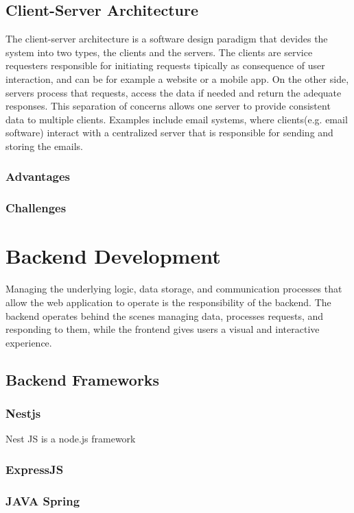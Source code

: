 \subsection{Client-Server Architecture}
The client-server architecture is a software design paradigm that devides the
system into two types, the clients and the servers. The clients are service
requesters responsible for initiating requests tipically as consequence of user
interaction, and can be for example a website or a mobile app. On the other
side, servers process that requests, access the data if needed and return the
adequate responses. This separation of concerns allows one server to provide
consistent data to multiple clients.
Examples include email systems, where clients(e.g. email software) interact with
a centralized server that is responsible for sending and storing the emails.

\subsubsection{Advantages}
\subsubsection{Challenges}


\section{Backend Development}
Managing the underlying logic, data storage, and communication processes that
allow the web application to operate is the responsibility of the backend.
The backend operates behind the scenes managing data, processes requests, and
responding to them, while the frontend gives users a visual and interactive
experience.

\subsection{Backend Frameworks}
\subsubsection{Nestjs}
Nest JS is a node.js framework\cite{nestJS}
\subsubsection{ExpressJS}
\subsubsection{JAVA Spring}

